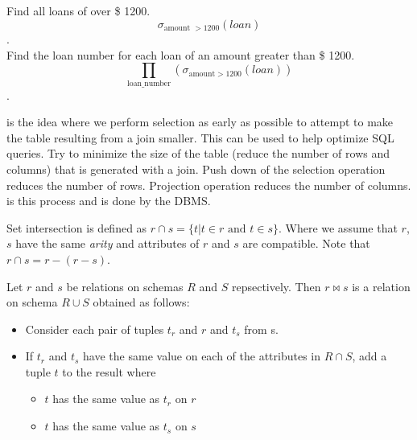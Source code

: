 \documentclass{article}
\begin{document}
\begin{example}
  Find all loans of over \$ 1200. $$\sigma_{\textrm{amount } > 1200}(loan)$$ . \\ 

  Find the loan number for each loan of an amount greater than \$ 1200. $$\prod_{\textrm{loan\_number}}(\sigma_{\textrm{amount}>1200}(loan))$$ . 
\end{example}

 is the idea where we perform selection as early as possible to attempt to make the table resulting from a join smaller. This can be used to help optimize SQL queries. Try to minimize the size of the table (reduce the number of rows and columns) that is generated with a join. Push down of the selection operation reduces the number of rows. Projection operation reduces the number of columns.  is this process and is done by the DBMS. 

\begin{definition}
  Set intersection is defined as $r \cap s = \{t \vert t \in r \textrm{ and } t \in s\}$. Where we assume that $r$,$s$ have the same \emph{arity} and attributes of $r$ and $s$ are compatible. Note that $r \cap s = r - (r - s)$. 
\end{definition}

\begin{definition}
  Let $r$ and $s$ be relations on schemas $R$ and $S$ repsectively. Then $r \bowtie s$ is a relation on schema $R \cup S$ obtained as follows: 
  \begin{itemize}
    \item Consider each pair of tuples $t_r$ and $r$ and $t_s$ from s. 
    \item If $t_r$ and $t_s$ have the same value on each of the attributes in $R \cap S$, add a tuple $t$ to the result where 
      \begin{itemize}
        \item $t$ has the same value as $t_r$ on $r$ 
        \item $t$ has the same value as $t_s$ on $s$
      \end{itemize}
  \end{itemize}
\end{definition}
\end{document}
